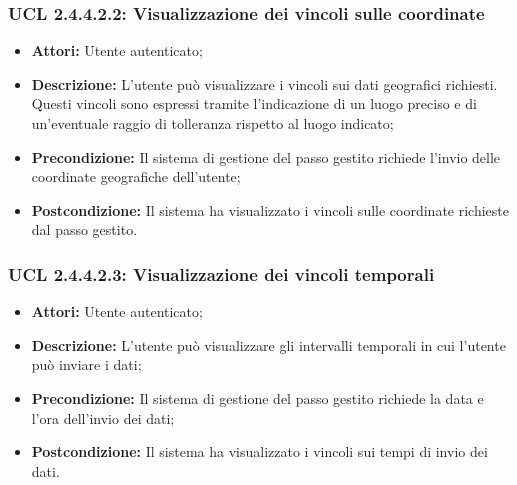 \hypertarget{L2.4.4.2.2}{}
\subsubsection{UCL 2.4.4.2.2: Visualizzazione dei vincoli sulle coordinate}
\begin{itemize}
\item \textbf{Attori:} Utente autenticato;
\item \textbf{Descrizione:} L'utente può visualizzare i vincoli sui dati geografici richiesti. Questi vincoli sono espressi tramite l'indicazione di un luogo preciso e di un'eventuale raggio di tolleranza rispetto al luogo indicato;
\item \textbf{Precondizione:} Il sistema di gestione del passo gestito richiede l'invio delle coordinate geografiche dell'utente;
\item \textbf{Postcondizione:} Il sistema ha visualizzato i vincoli sulle coordinate richieste dal passo gestito.
\end{itemize}

\hypertarget{L2.4.4.2.3}{}
\subsubsection{UCL 2.4.4.2.3: Visualizzazione dei vincoli temporali}
\begin{itemize}
\item \textbf{Attori:} Utente autenticato;
\item \textbf{Descrizione:} L'utente può visualizzare gli intervalli temporali in cui l'utente può inviare i dati;
\item \textbf{Precondizione:} Il sistema di gestione del passo gestito richiede la data e l'ora dell'invio dei dati;
\item \textbf{Postcondizione:} Il sistema ha visualizzato i vincoli sui tempi di invio dei dati.
\end{itemize}

